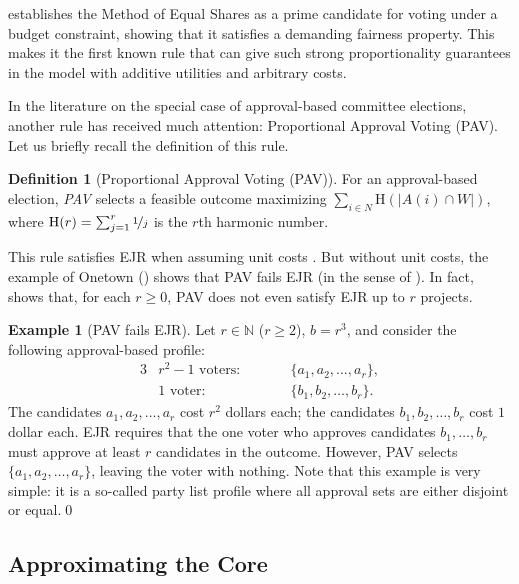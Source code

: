 \documentclass[10pt]{scrartcl}
\renewcommand*{\ge}{\geqslant}
\renewcommand*{\geq}{\geqslant}
\newcommand{\myemph}[1]{{\color{winered}\emph{#1}}}
\newcommand{\naturals}{{{\mathbb{N}}}}
\theoremstyle{definition}
\newtheorem{definition}{Definition}
\newtheorem{example}{Example}
\theoremstyle{plain}
\begin{document}
 establishes the Method of Equal Shares as a prime candidate for voting under a budget constraint, showing that it satisfies a demanding fairness property. This makes it the first known rule that can give such strong proportionality guarantees in the model with additive utilities and arbitrary costs. 

In the literature on the special case of approval-based committee elections, another rule has received much attention: Proportional Approval Voting (PAV). Let us briefly recall the definition of this rule.

\begin{definition}[Proportional Approval Voting (PAV)]
	For an approval-based election, \myemph{PAV} selects a feasible outcome maximizing $\sum_{i \in N} \mathrm{H}(|A(i) \cap W|)$,
	where $\mathrm{H}(r) = \sum_{j = 1}^r \nicefrac{1}{j}$ is the $r$th harmonic number.
\end{definition}

This rule satisfies EJR when assuming unit costs \citep{justifiedRepresentation}.
But without unit costs, the example of Onetown () shows that PAV fails EJR (in the sense of ). In fact,  shows that, for each $r \ge 0$, PAV does not even satisfy EJR up to $r$ projects.


\begin{example}
	[PAV fails EJR]
	\label{ex:pav_no_ejr}
	Let $r \in \naturals$ ($r \geq 2$), $b = r^3$, and consider the following approval-based profile:
	\begin{alignat*}{3}
		&\text{$r^2-1$ voters:} &\qquad& \{a_1, a_2, \ldots, a_r\}, \\
		&\text{$1$ voter:}      && \{b_1, b_2, \ldots, b_r\}.
	\end{alignat*}
	The candidates $a_1, a_2, \ldots, a_r$ cost $r^2$ dollars each; the candidates $b_1, b_2, \ldots, b_{r}$ cost $1$ dollar each. EJR requires that the one voter who approves candidates $b_1, \ldots, b_r$ must approve at least $r$ candidates in the outcome. However, PAV selects $\{a_1, a_2, \ldots, a_r\}$, leaving the voter with nothing. Note that this example is very simple: it is a so-called party list profile where all approval sets are either disjoint or equal.\qed
\end{example}

\subsection{Approximating the Core}
\end{document}
